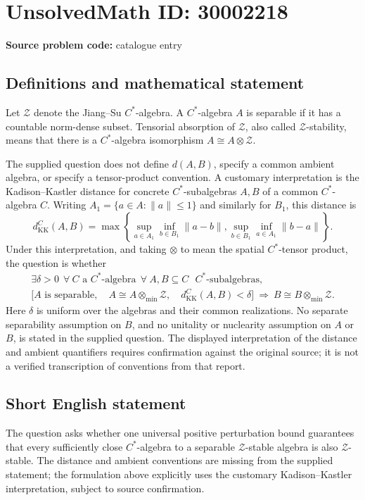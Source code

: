 \documentclass[11pt]{article}
\begin{document}
\section*{UnsolvedMath ID: 30002218}
\textbf{Source problem code:} catalogue entry
\subsection{Definitions and mathematical statement}
Let \(\mathcal Z\) denote the Jiang--Su \(C^*\)-algebra. A \(C^*\)-algebra \(A\) is separable if it has a countable norm-dense subset. Tensorial absorption of \(\mathcal Z\), also called \(\mathcal Z\)-stability, means that there is a \(C^*\)-algebra isomorphism \(A\cong A\otimes\mathcal Z\).

The supplied question does not define \(d(A,B)\), specify a common ambient algebra, or specify a tensor-product convention. A customary interpretation is the Kadison--Kastler distance for concrete \(C^*\)-subalgebras \(A,B\) of a common \(C^*\)-algebra \(C\). Writing \(A_1=\{a\in A:\|a\|\leq 1\}\) and similarly for \(B_1\), this distance is
\[
 d_{\mathrm{KK}}^C(A,B)=\max\left\{
 \sup_{a\in A_1}\inf_{b\in B_1}\|a-b\|,
 \sup_{b\in B_1}\inf_{a\in A_1}\|b-a\|
 \right\}.
\]
Under this interpretation, and taking \(\otimes\) to mean the spatial \(C^*\)-tensor product, the question is whether
\[
\begin{gathered}
\exists\delta>0\ \ \forall\ C\text{ a }C^*\text{-algebra}\ \ \forall\ A,B\subseteq C\text{ }C^*\text{-subalgebras},\\
\bigl[A\text{ is separable},\quad A\cong A\otimes_{\min}\mathcal Z,\quad d_{\mathrm{KK}}^C(A,B)<\delta\bigr]
\ \Longrightarrow\ B\cong B\otimes_{\min}\mathcal Z.
\end{gathered}
\]
Here \(\delta\) is uniform over the algebras and their common realizations. No separate separability assumption on \(B\), and no unitality or nuclearity assumption on \(A\) or \(B\), is stated in the supplied question. The displayed interpretation of the distance and ambient quantifiers requires confirmation against the original source; it is not a verified transcription of conventions from that report.
\subsection{Short English statement}
The question asks whether one universal positive perturbation bound guarantees that every sufficiently close \(C^*\)-algebra to a separable \(\mathcal Z\)-stable algebra is also \(\mathcal Z\)-stable. The distance and ambient conventions are missing from the supplied statement; the formulation above explicitly uses the customary Kadison--Kastler interpretation, subject to source confirmation.
\end{document}
